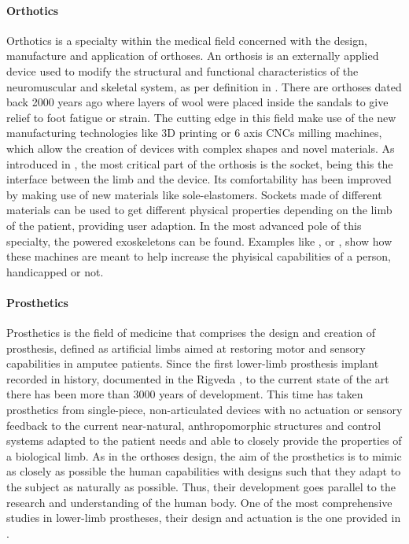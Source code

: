 \paragraph{Orthotics} %
\label{par:orthotics}
Orthotics is a specialty within the medical field concerned with the design, manufacture and application of orthoses. An orthosis is an externally applied device used to modify the structural and functional characteristics of the neuromuscular and skeletal system, as per definition in \cite{ISO_orthosis}. 
There are orthoses dated back 2000 years ago where layers of wool were placed inside the sandals to give relief to foot fatigue or strain.
The cutting edge in this field make use of the new manufacturing technologies like 3D printing or 6 axis CNCs milling machines, which allow the creation of devices with complex shapes and novel materials.
As introduced in \cite{herbert2005preliminary}, the most critical part of the orthosis is the socket, being this the interface between the limb and the device.
Its comfortability has been improved by making use of new materials like sole-elastomers.
Sockets made of different materials can be used to get different physical properties depending on the limb of the patient, providing user adaption.
In the most advanced pole of this specialty, the powered exoskeletons can be found. Examples like \cite{zoss2006biomechanical}, \cite{veneman2007design} or \cite{pratt2004roboknee}, show how these machines are meant to help increase the phyisical capabilities of a person, handicapped or not.

\paragraph{Prosthetics} %
\label{par:prosthetics}
Prosthetics is the field of medicine that comprises the design and creation of prosthesis, defined as artificial limbs aimed at restoring motor and sensory capabilities in amputee patients.
Since the first lower-limb prosthesis implant recorded in history, documented in the Rigveda \cite{prosthetics_history}, to the current state of the art there has been more than 3000 years of development.
This time has taken prosthetics from single-piece, non-articulated devices with no actuation or sensory feedback to the current near-natural, anthropomorphic structures and control systems adapted to the patient needs and able to closely provide the properties of a biological limb.
As in the orthoses design, the aim of the prosthetics is to mimic as closely as possible the human capabilities with designs such that they adapt to the subject as naturally as possible.
Thus, their development goes parallel to the research and understanding of the human body.
One of the most comprehensive studies in lower-limb prostheses, their design and actuation is the one provided in \cite{grimmer}.

